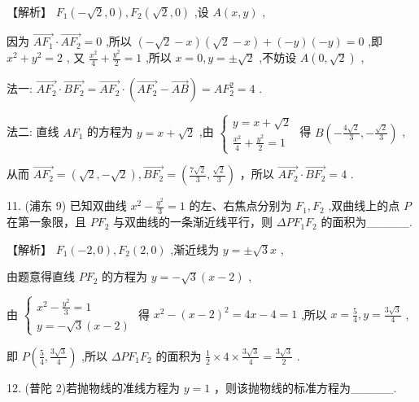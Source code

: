 \documentclass[10pt]{article}
\begin{document}
【解析】 \({F}_{1}\left( {-\sqrt{2},0}\right) ,{F}_{2}\left( {\sqrt{2},0}\right)\) ,设 \(A\left( {x,y}\right)\) ,

因为 \(\overrightarrow{A{F}_{1}} \cdot  \overrightarrow{A{F}_{2}} = 0\) ,所以 \(\left( {-\sqrt{2} - x}\right) \left( {\sqrt{2} - x}\right)  + \left( {-y}\right) \left( {-y}\right)  = 0\) ,即 \({x}^{2} + {y}^{2} = 2\) , 又 \(\frac{{x}^{2}}{4} + \frac{{y}^{2}}{2} = 1\) ,所以 \(x = 0,y =  \pm  \sqrt{2}\) ,不妨设 \(A\left( {0,\sqrt{2}}\right)\) ,

法一: \(\overrightarrow{A{F}_{2}} \cdot  \overrightarrow{B{F}_{2}} = \overrightarrow{A{F}_{2}} \cdot  \left( {\overrightarrow{A{F}_{2}} - \overrightarrow{AB}}\right)  = A{F}_{2}^{2} = 4\) .

法二: 直线 \(A{F}_{1}\) 的方程为 \(y = x + \sqrt{2}\) ,由 \(\left\{  \begin{array}{l} y = x + \sqrt{2} \\  \frac{{x}^{2}}{4} + \frac{{y}^{2}}{2} = 1 \end{array}\right.\) 得 \(B\left( {-\frac{4\sqrt{2}}{3}, - \frac{\sqrt{2}}{3}}\right)\) ,

从而 \(\overrightarrow{A{F}_{2}} = \left( {\sqrt{2}, - \sqrt{2}}\right) ,\overrightarrow{B{F}_{2}} = \left( {\frac{7\sqrt{2}}{3},\frac{\sqrt{2}}{3}}\right)\) ，所以 \(\overrightarrow{A{F}_{2}} \cdot  \overrightarrow{B{F}_{2}} = 4\) .

11. (浦东 9) 已知双曲线 \({x}^{2} - \frac{{y}^{2}}{3} = 1\) 的左、右焦点分别为 \({F}_{1},{F}_{2}\) ,双曲线上的点 \(P\) 在第一象限，且 \(P{F}_{2}\) 与双曲线的一条渐近线平行，则 \({\Delta P}{F}_{1}{F}_{2}\) 的面积为\_\_\_\_\_.

【解析】 \({F}_{1}\left( {-2,0}\right) ,{F}_{2}\left( {2,0}\right)\) ,渐近线为 \(y =  \pm  \sqrt{3}x\) ,

由题意得直线 \(P{F}_{2}\) 的方程为 \(y =  - \sqrt{3}\left( {x - 2}\right)\) ,

由 \(\left\{  \begin{array}{l} {x}^{2} - \frac{{y}^{2}}{3} = 1 \\  y =  - \sqrt{3}\left( {x - 2}\right)  \end{array}\right.\) 得 \({x}^{2} - {\left( x - 2\right) }^{2} = {4x} - 4 = 1\) ,所以 \(x = \frac{5}{4},y = \frac{3\sqrt{3}}{4}\) ,

即 \(P\left( {\frac{5}{4},\frac{3\sqrt{3}}{4}}\right)\) ,所以 \({\Delta P}{F}_{1}{F}_{2}\) 的面积为 \(\frac{1}{2} \times  4 \times  \frac{3\sqrt{3}}{4} = \frac{3\sqrt{3}}{2}\) .

12. (普陀 2)若抛物线的准线方程为 \(y = 1\) ，则该抛物线的标准方程为\_\_\_\_\_.
\end{document}
